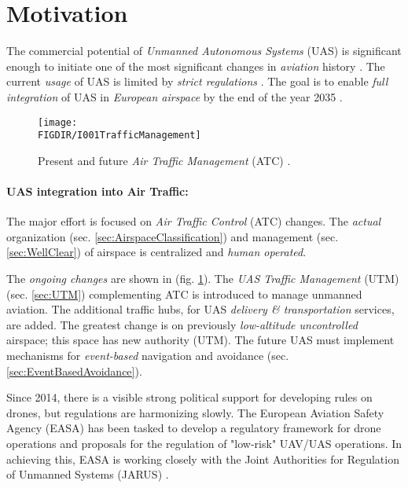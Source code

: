 \section{Motivation}\label{s:motivation}
\noindent The commercial potential of \emph{Unmanned Autonomous Systems} (UAS) is significant  enough to initiate one of the most significant changes in \emph{aviation} history \cite{airbusUTM2018blueprint}. The current \emph{usage} of UAS is limited by \emph{strict regulations} \cite{icao4444,icaoAnnex2,icaoAnnex11}. The goal is to enable \emph{full integration} of UAS in \emph{European airspace} by the end of the year 2035 \cite{eurocontrol2018rpasatm}.


\begin{figure}[H]
    \centering
    \texttt{[image: \\FIGDIR/I001TrafficManagement]}
    \caption{Present and future \emph{Air Traffic Management} (ATC) \cite{airbusUTM2018blueprint}.}
    \label{fig:airTrafficManagementEvolution}
\end{figure}

\paragraph{UAS integration into Air Traffic:} The major effort is focused on \emph{Air Traffic Control} (ATC) changes. The \emph{actual} organization (sec. \ref{sec:AirspaceClassification}) and management (sec. \ref{sec:WellClear}) of airspace is centralized and \emph{human operated}.  

The \emph{ongoing changes} are shown in (fig. \ref{fig:airTrafficManagementEvolution}). The \emph{UAS Traffic Management} (UTM) (sec. \ref{sec:UTM}) complementing ATC is introduced to manage unmanned aviation. The additional traffic hubs, for UAS \emph{delivery \& transportation} services, are added. The greatest change is on previously \emph{low-altitude uncontrolled} airspace; this space has new authority (UTM). The future UAS must implement mechanisms for \emph{event-based} navigation and avoidance (sec. \ref{sec:EventBasedAvoidance}).

Since 2014, there is a visible strong political support for developing rules on drones, but regulations are harmonizing slowly. The European Aviation Safety Agency (EASA) has been tasked to develop a regulatory framework for drone operations and proposals for the regulation of "low-risk" UAV/UAS operations. In achieving this, EASA is working closely with the Joint Authorities for Regulation of Unmanned Systems (JARUS) \cite{jarus2016regulations}.

